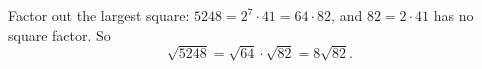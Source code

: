 Factor out the largest square: $5248=2^7\cdot41=64\cdot82$, and $82=2\cdot41$ has no square factor. So
\[\sqrt{5248}=\sqrt{64}\cdot\sqrt{82}=\boxed{8\sqrt{82}}.\]
